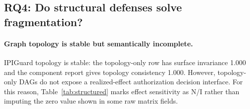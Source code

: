 \documentclass[11pt]{article}
\newcommand{\notident}{\textsc{N/I}}
\begin{document}
\begin{table}[t]
\centering
\small
\caption{Main counterfactual lattice metrics. Higher is better for upward-arrow columns; lower is better for downward-arrow columns. Artifact paths are listed in Appendix~\ref{app:artifact-map}.}
\label{tab:lattice}
\end{table}

\subsection{RQ4: Do structural defenses solve fragmentation?}
\paragraph{Graph topology is stable but semantically incomplete.}
IPIGuard topology is stable: the topology-only row has surface invariance 1.000 and the component report gives topology consistency 1.000. However, topology-only DAGs do not expose a realized-effect authorization decision interface. For this reason, Table~\ref{tab:structured} marks effect sensitivity as \notident{} rather than imputing the zero value shown in some raw matrix fields.
\end{document}
